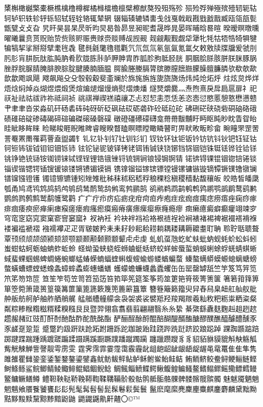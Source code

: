橥槲橄樾檠橐橛樵檎橹樽樨橘橼檑檐檩檗檫猷獒殁殂殇殄
殒殓殍殚殛殡殪轫轭轱轲轳轵轶轸轷轹轺轼轾辁辂辄辇辋
辍辎辏辘辚軎戋戗戛戟戢戡戥戤戬臧瓯瓴瓿甏甑甓⽁攴旮
旯旰昊昙杲昃昕昀炅曷昝昴昱昶昵耆晟晔晁晏晖晡晗晷暄
暌暧暝暾曛曜曦曩贲贳贶贻贽赀赅赆赈赉赇赍赕赙觇觊觋
觌觎觏觐觑牮犟牝牦牯牾牿犄犋犍犏犒挈挲掰搿擘耄毪毳
毽毵毹氅氇氆氍氕氘氙氚氡氩氤氪氲攵敕敫牍牒牖爰虢刖
肟肜肓肼朊肽肱肫肭肴肷胧胨胩胪胛胂胄胙胍胗朐胝胫胱
胴胭脍脎胲胼朕脒豚脶脞脬脘脲腈腌腓腴腙腚腱腠腩腼腽
腭腧塍媵膈膂膑滕膣膪臌朦臊膻臁膦欤欷欹歃歆歙飑飒飓
飕飙飚⽎殳彀毂觳斐齑斓於旆旄旃旌旎旒旖炀炜炖炝炻烀
炷炫炱烨烊焐焓焖焯焱煳煜煨煅煲煊煸煺熘熳熵熨熠燠燔
燧燹爝爨灬焘煦熹戾戽扃扈扉礻祀祆祉祛祜祓祚祢祗祠祯
祧祺禅禊禚禧禳忑忐怼恝恚恧恁恙恣悫愆愍慝憩憝懋懑戆
肀⾀聿沓泶淼矶矸砀砉砗砘砑斫砭砜砝砹砺砻砟砼砥砬砣
砩硎硭硖硗砦硐硇硌硪碛碓碚碇碜碡碣碲碹碥磔磙磉磬磲
礅磴礓礤礞礴龛⿋黹黻黼盱眄眍盹眇眈眚眢眙眭眦眵眸睐
睑睇睃睚睨睢睥睿瞍睽瞀瞌瞑瞟瞠瞰瞵瞽町畀畎畋畈畛畲
畹疃罘罡罟詈罨罴罱罹羁罾盍盥蠲钅钆钇钋钊钌钍钏钐钔
钗钕钚钛钜钣钤钫钪钭钬钯钰钲钴钶钷钸钹钺钼钽钿铄铈
铉铊铋铌铍铎铐铑铒铕铖铗铙铘铛铞铟铠铢铤铥铧铨铪铩
铫铮铯铳铴铵铷铹铼铽铿锃锂锆锇锉锊锍锎锏锒锓锔锕锖
锘锛锝锞锟锢锪锫锩锬锱锲锴锶锷锸锼锾锿镂锵镄镅镆镉
镌镎镏镒镓镔镖镗镘镙镛镞镟镝镡镢镤镥镦镧镨镩镪镫镬
镯镱镲镳锺矧矬雉秕秭秣秫稆嵇稃稂稞稔稹稷穑黏馥穰皈
皎皓皙皤瓞瓠甬鸠鸢鸨鸩鸪鸫鸬鸲鸱鸶鸸鸷鸹鸺鸾鹁鹂鹄
鹆鹇鹈鹉鹋鹌鹎鹑鹕鹗鹚鹛鹜鹞鹣鹦鹧鹨鹩鹪鹫鹬鹱鹭鹳
⽧疒疔疖疠疝疬疣疳疴疸痄疱疰痃痂痖痍痣痨痦痤痫痧瘃
痱痼痿瘐瘀瘅瘌瘗瘊瘥瘘瘕瘙瘛瘼瘢瘠癀瘭瘰瘿瘵癃瘾瘳
癍癞癔癜癖癫癯翊竦穸穹窀窆窈窕窦窠窬窨窭窳衤衩衲衽
衿袂袢裆袷袼裉裢裎裣裥裱褚裼裨裾裰褡褙褓褛褊褴褫褶
襁襦襻⽦疋胥皲皴矜⽾耒耔耖耜耠耢耥耦耧耩耨耱耋耵聃
聆聍聒聩聱覃顸颀颃颉颌颍颏颔颚颛颞颟颡颢颥颦⾌虍虔
虬虮虿虺虼虻蚨蚍蚋蚬蚝蚧蚣蚪蚓蚩蚶蛄蚵蛎蚰蚺蚱蚯蛉
蛏蚴蛩蛱蛲蛭蛳蛐蜓蛞蛴蛟蛘蛑蜃蜇蛸蜈蜊蜍蜉蜣蜻蜞蜥
蜮蜚蜾蝈蜴蜱蜩蜷蜿螂蜢蝽蝾蝻蝠蝰蝌蝮螋蝓蝣蝼蝤蝙蝥
螓螯螨蟒蟆螈螅螭螗螃螫蟥螬螵螳蟋蟓螽蟑蟀蟊蟛蟪蟠蟮
蠖蠓蟾蠊蠛蠡蠹蠼⽸缶罂罄罅舐竺竽笈笃笄笕笊笫笏筇笸
笪笙笮笱笠笥笤笳笾笞筘筚筅筵筌筝筠筮筻筢筲筱箐箦箧
箸箬箝箨箅箪箜箢箫箴篑篁篌篝篚篥篦篪簌篾篼簏簖簋簟
簪簦簸籁籀臾舁舂舄臬衄舡舢舣舭舯舨舫舸舻舳舴舾艄艉
艋艏艚艟艨衾袅袈裘裟襞羝羟羧羯羰羲籼敉粑粝粜粞粢粲
粼粽糁糇糌糍糈糅糗糨⾉艮暨羿翎翕翥翡翦翩翮翳⽷糸絷
綦綮繇纛麸麴赳趄趔趑趱赧赭豇豉酊酐酎酏酤酢酡酰酩酯
酽酾酲酴酹醌醅醐醍醑醢醣醪醭醮醯醵醴醺⾗豕鹾趸跫踅
蹙蹩趵趿趼趺跄跖跗跚跞跎跏跛跆跬跷跸跣跹跻跤踉跽踔
踝踟踬踮踣踯踺蹀踹踵踽踱蹉蹁蹂蹑蹒蹊蹰蹶蹼蹯蹴躅躏
躔躐躜躞⾘豸貂貊貅貘貔斛觖觞觚觜觥觫觯訾謦靓雩雳雯
霆霁霈霏霎霪霭霰霾龀龃龅龆龇龈龉龊龌黾鼋鼍⾫隹隼隽
雎雒瞿雠銎銮鋈錾鍪鏊鎏鐾鑫鱿鲂鲅鲆鲇鲈稣鲋鲎鲐鲑鲒
鲔鲕鲚鲛鲞鲟鲠鲡鲢鲣鲥鲦鲧鲨鲩鲫鲭鲮鲰鲱鲲鲳鲴鲵鲶
鲷鲺鲻鲼鲽鳄鳅鳆鳇鳊鳋鳌鳍鳎鳏鳐鳓鳔鳕鳗鳘鳙鳜鳝鳟
鳢靼鞅鞑鞒鞔鞯鞫鞣鞲鞴骱骰骷鹘骶骺骼髁髀髅髂髋髌髑
魅魃魇魉魈魍魑飨餍餮饕饔⾽髟髡髦髯髫髻髭髹鬈鬏鬓鬟
鬣麽麾縻麂麇麈麋麒鏖麝麟黛黜黝黠黟黢黩黧黥黪黯鼢鼬
鼯鼹鼷鼽鼾齄〇©™

